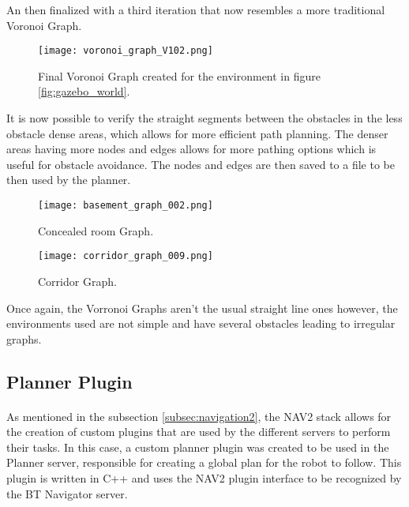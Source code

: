 An then finalized with a third iteration that now resembles a more 
traditional Voronoi Graph.
\begin{figure}[h]
    \centering
    \texttt{[image: voronoi\_graph\_V102.png]}
    \caption{Final Voronoi Graph created for the environment in figure \ref{fig:gazebo_world}.}
    \label{fig:voronoi_graph3}
\end{figure}

It is now possible to verify the straight segments between the obstacles in the 
less obstacle dense areas, which allows for more efficient path planning. The denser areas 
having more nodes and edges allows for more pathing options which is useful 
for obstacle avoidance. The nodes and edges are then saved to a file to be 
then used by the planner.
\begin{figure}[h]
    \centering
    \texttt{[image: basement\_graph\_002.png]}
    \caption{Concealed room Graph.}
    \label{fig:basement_graph_002}
\end{figure}
\begin{figure}[h]
    \centering
    \texttt{[image: corridor\_graph\_009.png]}
    \caption{Corridor Graph.}
    \label{fig:corridor_graph_009}
\end{figure}
\clearpage

Once again, the Vorronoi Graphs aren't the usual straight line ones however, the environments 
used are not simple and have several obstacles leading to irregular graphs.

\subsection{Planner Plugin}
\label{subsec:planner_plugin}
\paragraph{}As mentioned in the subsection \ref{subsec:navigation2}, the \gls{NAV2} stack allows for the creation of custom plugins that are 
used by the different servers to perform their tasks. In this case, a custom planner plugin was 
created to be used in the Planner server, responsible for creating a global plan 
for the robot to follow. This plugin is written in C++ and uses the 
\gls{NAV2} plugin interface to be recognized by the BT Navigator server.

